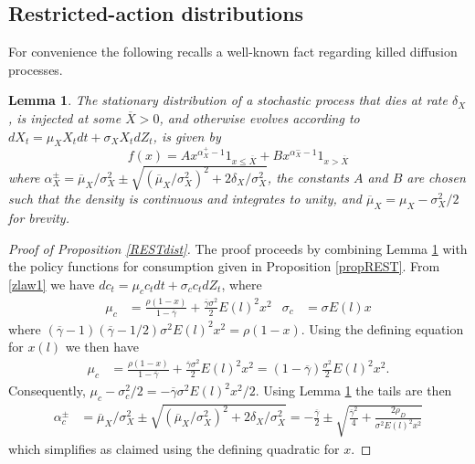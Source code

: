 \documentclass[11pt]{article}
\theoremstyle{plain}
\newtheorem{lemma}[thm]{Lemma}
\begin{document}
\subsection{Restricted-action distributions} \label{restDISTsect}
For convenience the following recalls a well-known fact regarding killed diffusion processes.
\begin{lemma} \label{genLEMMA}
The stationary distribution of a stochastic process that dies at rate $\delta_X$, is injected at some $\overline{X} > 0$, and otherwise evolves according to $dX_t = \mu_XX_tdt + \sigma_XX_t dZ_t$, is given by 
$$
f(x) = A x^{\alpha^+_X-1}1_{x \leq \overline{X}} + B x^{\alpha^-_X-1}1_{x > \overline{X}}
$$
where $\alpha^{\pm}_X =  \overline{\mu}_X/\sigma_X^2 \pm  \sqrt{(\overline{\mu}_X/\sigma_X^2)^2+2\delta_X/\sigma_X^2}$, the constants $A$ and $B$ are chosen such that the density is continuous and integrates to unity, and $\overline{\mu}_X = \mu_X - \sigma_X^2/2$ for brevity.
\end{lemma}
\begin{proof}[Proof of Proposition \ref{RESTdist}] The proof proceeds by combining Lemma \ref{genLEMMA} with the policy functions for consumption given in Proposition \ref{propREST}. From \eqref{zlaw1} we have $dc_t = \mu_cc_tdt + \sigma_cc_t dZ_t$, where
\begin{align*}
\mu_c & = \frac{\rho(1 - x)}{1-\overline{\gamma}} + \frac{\overline{\gamma}\sigma^2}{2}E(l)^2x^2  &
\sigma_c & = \sigma E(l)x
\end{align*}
where $(\overline{\gamma} - 1) (\overline{\gamma} - 1/2) \sigma^2 E(l)^2 x^2 = \rho(1 - x)$. Using the defining equation for $x(l)$ we then have 
\begin{align*}
\mu_c & = \frac{\rho(1 - x)}{1-\overline{\gamma}} + \frac{\overline{\gamma}\sigma^2}{2}E(l)^2x^2 = (1 - \overline{\gamma})\frac{\sigma^2}{2}E(l)^2x^2.
\end{align*}
Consequently, $\mu_c - \sigma_c^2/2 = -\overline{\gamma} \sigma^2 E(l)^2x^2/2$. Using Lemma \ref{genLEMMA} the tails are then
\begin{align*}
\alpha^{\pm}_c &  =  \overline{\mu}_X/\sigma_X^2 \pm  \sqrt{{\left(\overline{\mu}_X/\sigma_X^2\right)}^2 + 2\delta_X/\sigma_X^2}   =  -\frac{\overline{\gamma}}{2}  \pm  \sqrt{ \frac{\overline{\gamma}^2}{4} + \frac{2\rho_D}{\sigma^2E(l)^2x^2}} 
\end{align*}
which simplifies as claimed using the defining quadratic for $x$. 
\end{proof}
\end{document}
